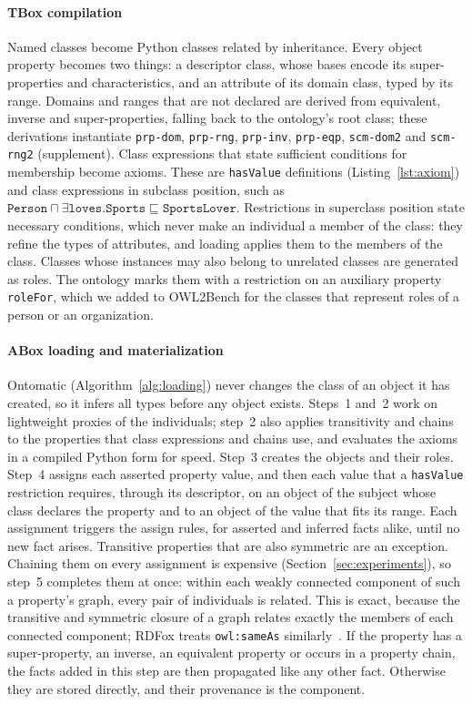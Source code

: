 \documentclass[sigconf,anonymous]{aamas}
\begin{document}
\paragraph{TBox compilation}
Named classes become Python classes related by inheritance. Every object property becomes two things: a descriptor class, whose bases encode its super-properties and characteristics, and an attribute of its domain class, typed by its range. Domains and ranges that are not declared are derived from equivalent, inverse and super-properties, falling back to the ontology's root class; these derivations instantiate \texttt{prp-dom}, \texttt{prp-rng}, \texttt{prp-inv}, \texttt{prp-eqp}, \texttt{scm-dom2} and \texttt{scm-rng2} (supplement). Class expressions that state sufficient conditions for membership become axioms. These are \texttt{hasValue} definitions (Listing~\ref{lst:axiom}) and class expressions in subclass position, such as $\texttt{Person}\sqcap\exists\texttt{loves}.\texttt{Sports}\sqsubseteq\texttt{SportsLover}$. Restrictions in superclass position state necessary conditions, which never make an individual a member of the class: they refine the types of attributes, and loading applies them to the members of the class. Classes whose instances may also belong to unrelated classes are generated as roles. The ontology marks them with a restriction on an auxiliary property \texttt{roleFor}, which we added to OWL2Bench for the classes that represent roles of a person or an organization.

\paragraph{ABox loading and materialization}
Ontomatic (Algorithm~\ref{alg:loading}) never changes the class of an object it has created, so it infers all types before any object exists. Steps~1 and~2 work on lightweight proxies of the individuals; step~2 also applies transitivity and chains to the properties that class expressions and chains use, and evaluates the axioms in a compiled Python form for speed. Step~3 creates the objects and their roles. Step~4 assigns each asserted property value, and then each value that a \texttt{hasValue} restriction requires, through its descriptor, on an object of the subject whose class declares the property and to an object of the value that fits its range. Each assignment triggers the assign rules, for asserted and inferred facts alike, until no new fact arises. Transitive properties that are also symmetric are an exception. Chaining them on every assignment is expensive (Section~\ref{sec:experiments}), so step~5 completes them at once: within each weakly connected component of such a property's graph, every pair of individuals is related. This is exact, because the transitive and symmetric closure of a graph relates exactly the members of each connected component; RDFox treats \texttt{owl:sameAs} similarly~\cite{motik2015sameas}. If the property has a super-property, an inverse, an equivalent property or occurs in a property chain, the facts added in this step are then propagated like any other fact. Otherwise they are stored directly, and their provenance is the component.
\end{document}

